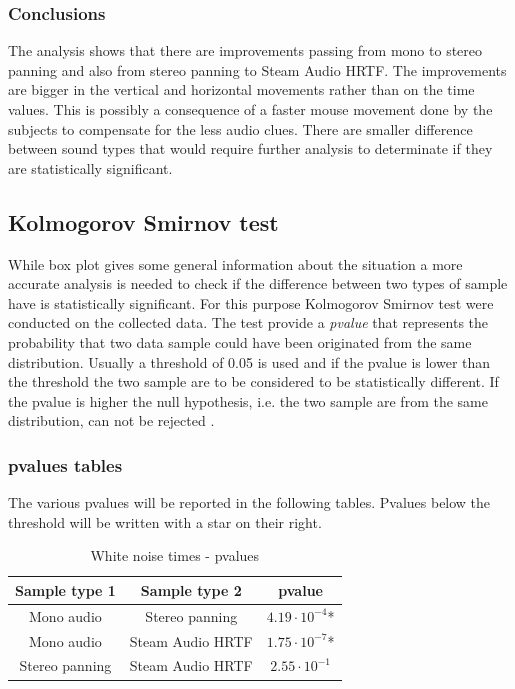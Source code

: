 \documentclass[conference]{IEEEtran}
\begin{document}
\subsubsection{Conclusions}
The analysis shows that there are improvements passing from mono to stereo panning and also from stereo panning to Steam Audio HRTF.
The improvements are bigger in the vertical and horizontal movements rather than on the time values. This is possibly a consequence of a faster mouse movement done by the subjects to compensate for the less audio clues. There are smaller difference between sound types that would require further analysis to determinate if they are statistically significant.\\

\subsection{Kolmogorov Smirnov test}
While box plot gives some general information about the situation a more accurate analysis is needed to check if the difference between two types of sample have is statistically significant. For this purpose Kolmogorov Smirnov test were conducted on the collected data. The test provide a \textit{pvalue} that represents the probability that two data sample could have been originated from the same distribution. Usually a threshold of 0.05 is used and if the pvalue is lower than the threshold the two sample are to be considered to be statistically different. If the pvalue is higher the null hypothesis, i.e. the two sample are from the same distribution, can not be rejected \cite{b14}.

\subsubsection{pvalues tables}
The various pvalues will be reported in the following tables. Pvalues below the threshold will be written with a star on their right.

\begin{table}[htbp]
\caption{White noise times - pvalues}
\begin{center}
\begin{tabular}{|c|c|c|}
\hline
\textbf{Sample type 1} & \textbf{Sample type 2} & \textbf{pvalue}\\
\hline
Mono audio & Stereo panning & $4.19 \cdot 10^{-4}$*\\
\hline
Mono audio & Steam Audio HRTF & $1.75 \cdot 10^{-7}$*\\
\hline
Stereo panning & Steam Audio HRTF & $2.55 \cdot 10^{-1}$\\
\hline
\end{tabular}
\label{tab1}
\end{center}
\end{table}
\end{document}
